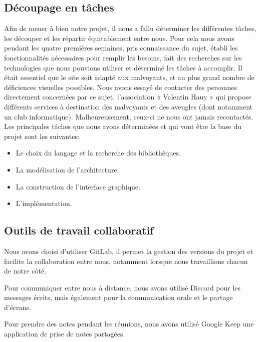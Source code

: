 \documentclass[12pt, openany]{report}
\begin{document}
\subsection{Découpage en tâches}
Afin de mener à bien notre projet, il nous a fallu déterminer les différentes tâches, les découper et les répartir équitablement entre nous.\newline
Pour  cela nous avons pendant  les  quatre  premières  semaines, pris  connaissance  du sujet, établi  les fonctionnalités  nécessaires  pour  remplir  les  besoins,  fait  des  recherches  sur  les technologies que nous pouvions utiliser et déterminé les tâches à accomplir. \newline 
Il était essentiel que le site soit adapté aux malvoyants, et au plus  grand nombre de déficiences visuelles possibles. Nous avons essayé de contacter des personnes directement concernées par ce sujet, l’association « Valentin Hauy » qui propose différents services à destination des malvoyants et des aveugles (dont notamment un club informatique). Malheureusement, ceux-ci ne nous ont jamais recontactés.\newline
Les principales tâches que nous avons déterminées et qui vont être la base du projet sont les suivantes: 
\begin{itemize}
    \item Le choix du langage et la recherche des bibliothèques.
    \item La modélisation de l'architecture. 
    \item La construction de l'interface graphique.
    \item L'implémentation.
\end{itemize}{}
\subsection{Outils de travail collaboratif}

Nous avons choisi d’utiliser GitLab, il permet la gestion des versions du projet et facilite la collaboration entre nous, notamment lorsque nous travaillions chacun de notre côté.\newline

Pour communiquer entre nous à distance, nous avons utilisé Discord pour les messages écrits, mais également pour la communication orale et le partage d’écrans.\newline

Pour prendre des notes pendant les réunions, nous avons utilisé Google Keep une application de prise de notes partagées.\newline
\end{document}
